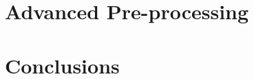 \documentclass[12pt]{article}
\begin{document}


\section{Advanced Pre-processing}

\section{Conclusions}







\newpage



\end{document}
